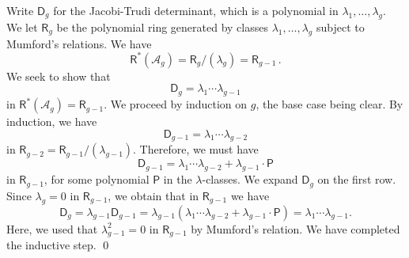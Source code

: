 \documentclass[11pt]{amsart}
\newtheorem{prop}[thm]{Proposition}
\theoremstyle{definition}
\newcommand{\R}{\mathsf{R}}
\newcommand{\A}{\mathcal{A}}
\begin{document}
{Write $\mathsf D_g$ for the Jacobi-Trudi determinant, which is a polynomial in $\lambda_1, \ldots, \lambda_g$. We let $\R_g$ be the polynomial ring generated by classes $\lambda_1, \ldots, \lambda_g$ subject to Mumford's relations. We have $$\R^*(\A_g)=\R_g/(\lambda_g)=\R_{g-1}\, .$$ We seek to show that $$\mathsf D_g= \lambda_{1} \cdots \lambda_{g-1}$$ in $\R^*(\A_g)=\R_{g-1}$. We proceed by induction on $g$, the base case being clear. By induction, we have $$\mathsf D_{g-1} = \lambda_{1} \cdots \lambda_{g-2}$$ in $\R_{g-2}=\R_{g-1}/(\lambda_{g-1})$. Therefore, we must have $$\mathsf D_{g-1}=\lambda_{1} \cdots \lambda_{g-2} + \lambda_{g-1} \cdot \mathsf P$$ in $\R_{g-1}$, for some polynomial $\mathsf P$ in the $\lambda$-classes. We expand $\mathsf D_g$ on the first row. Since $\lambda_g=0$ in $\R_{g-1}$, we obtain that in $\R_{g-1}$ we have $$\mathsf D_g=\lambda_{g-1} \mathsf D_{g-1} =\lambda_{g-1} (\lambda_{1} \cdots \lambda_{g-2} + \lambda_{g-1} \cdot \mathsf P)=\lambda_{1} \cdots \lambda_{g-1}.$$ Here, we used that $\lambda_{g-1}^2=0$ in $\R_{g-1}$ by Mumford's relation. We have completed the inductive step. \qed

}
\end{document}
